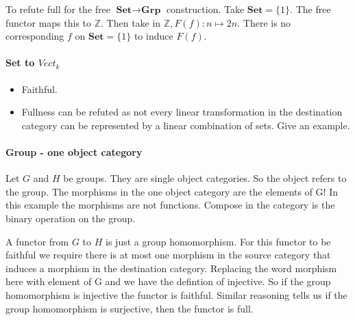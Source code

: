 \documentclass{article}
\begin{document}
\begin{center}
\end{center}



To refute full for the free $\textbf{Set} \rightarrow \textbf{Grp}$ construction. Take $\mathbf{Set}=\{ 1 \}$. The free functor maps this to $\mathds{Z}$. Then take in $\mathds{Z}, F(f)\colon n \mapsto 2n$. There is no corresponding $f$ on $\mathbf{Set}=\{ 1 \}$ to induce $F(f)$.

\paragraph{Set to $Vect_k$}

\begin{itemize}

\item Faithful.

\item Fullness can be refuted as not every linear transformation in the destination category can be represented by a linear combination of sets. Give an example.

\end{itemize}

\paragraph{Group - one object category}

Let $G$ and $H$ be groups. They are single object categories. So the object refers to the group. The morphisms in the one object category are the elements of G! In this example the morphisms are not functions. Compose in the category is the binary operation on the group.

A functor from $G$ to $H$ is just a group homomorphism. For this functor to be faithful we require there is at most one morphism in the source category that induces a morphism in the destination category. Replacing the word morphism here with element of G and we have the defintion of injective. So if the group homomorphism is injective the functor is faithful. Similar reasoning tells us if the group homomorphism is surjective, then the functor is full.
\end{document}
